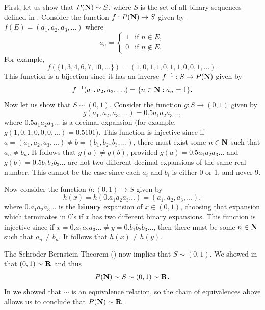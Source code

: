 \documentclass{lew98_solutions}
\begin{document}
\begin{solution}
    First, let us show that \( P(\mathbf{N}) \sim S \), where \( S \) is the set of all binary sequences defined in . Consider the function \( f : P(\mathbf{N}) \to S \) given by \( f(E) = (a_1, a_2, a_3, \ldots) \) where
    \[
        a_n = \begin{cases}
            1 & \text{if } n \in E, \\
            0 & \text{if } n \not\in E.
        \end{cases}
    \]
    For example,
    \[
        f(\{ 1, 3, 4, 6, 7, 10, \ldots \}) = (1, 0, 1, 1, 0, 1, 1, 0, 0, 1, \ldots).
    \]
    This function is a bijection since it has an inverse \( f^{-1} : S \to P(\mathbf{N}) \) given by
    \[
        f^{-1}(a_1, a_2, a_3, \ldots) = \{ n \in \mathbf{N} : a_n = 1 \}.
    \]
    Now let us show that \( S \sim (0, 1) \). Consider the function \( g : S \to (0, 1) \) given by
    \[
        g(a_1, a_2, a_3, \ldots) = 0.5 a_1 a_2 a_3 \ldots,
    \]
    where \( 0.5 a_1 a_2 a_3 \ldots \) is a decimal expansion (for example, \( g(1, 0, 1, 0, 0, 0, \ldots) = 0.5101 \)). This function is injective since if \( a = (a_1, a_2, a_3, \ldots) \neq b = (b_1, b_2, b_3, \ldots) \), there must exist some \( n \in \mathbf{N} \) such that \( a_n \neq b_n \). It follows that \( g(a) \neq g(b) \), provided \( g(a) = 0.5 a_1 a_2 a_3 \ldots  \) and \( g(b) = 0.5 b_1 b_2 b_3 \ldots \) are not two different decimal expansions of the same real number. This cannot be the case since each \( a_i \) and \( b_i \) is either 0 or 1, and never 9.

    Now consider the function \( h : (0, 1) \to S \) given by
    \[
        h(x) = h(0.a_1 a_2 a_3 \ldots) = (a_1, a_2, a_3, \ldots),
    \]
    where \( 0.a_1 a_2 a_3 \ldots \) is the \textbf{binary} expansion of \( x \in (0, 1) \), choosing that expansion which terminates in 0's if \( x \) has two different binary expansions. This function is injective since if \( x = 0.a_1 a_2 a_3 \ldots \neq y = 0.b_1 b_2 b_3 \ldots \), then there must be some \( n \in \mathbf{N} \) such that \( a_n \neq b_n \). It follows that \( h(x) \neq h(y) \).

    The Schröder-Bernstein Theorem () now implies that \( S \sim (0, 1) \). We showed in  that \( (0, 1) \sim \mathbf{R} \) and thus
    \[
        P(\mathbf{N}) \sim S \sim (0, 1) \sim \mathbf{R}.
    \]
    In  we showed that \( \sim \) is an equivalence relation, so the chain of equivalences above allows us to conclude that \( P(\mathbf{N}) \sim \mathbf{R} \).
\end{solution}
\end{document}
